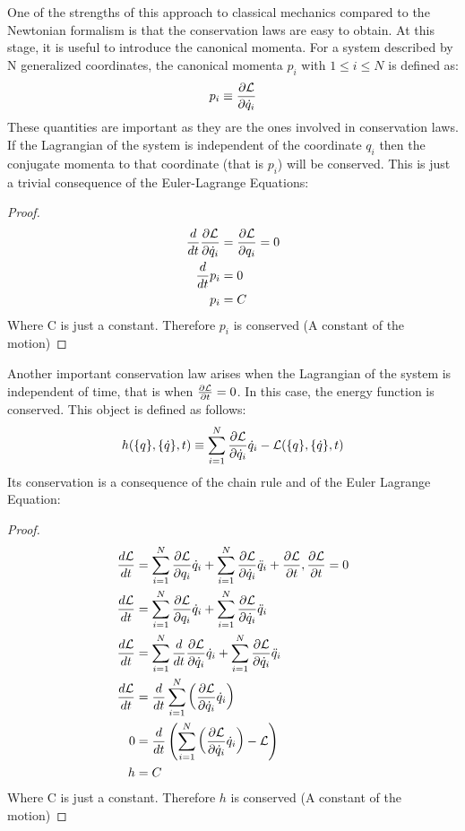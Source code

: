 \vspace{1mm}\noindent One of the strengths of this approach to classical mechanics compared to the Newtonian formalism is that the conservation laws are easy to obtain. At this stage, it is useful to introduce the canonical momenta. For a system described by N generalized coordinates, the canonical momenta $p_i$ with $1\leq i \leq N$ is defined as:
\begin{equation}
    p_i \equiv \frac{\partial \mathcal{L}}{\partial \dot q_i}
\end{equation}
These quantities are important as they are the ones involved in conservation laws. If the Lagrangian of the system is independent of the coordinate $q_i$ then the conjugate momenta to that coordinate (that is $p_i$) will be conserved. This is just a trivial consequence of the Euler-Lagrange Equations:
\begin{proof}
    \begin{align}
      \frac{d}{dt} \frac{\partial  \mathcal{L}}{\partial \dot q_i} &=   \frac{\partial  \mathcal{L}}{\partial q_i} = 0 \\
      \frac{d}{dt} p_i &= 0 \\
      p_i &= C
\end{align}
Where C is just a constant. Therefore $p_i$ is conserved (A constant of the motion)
\end{proof}
Another important conservation law arises when the Lagrangian of the system is independent of time, that is when $\frac{\partial\mathcal{L}}{\partial t}=0$. In this case, the energy function is conserved. This object is defined as follows:
\begin{equation}
    h(\{q\},\{\dot q\},t) \equiv \sum_{i=1}^N \frac{\partial  \mathcal{L}}{\partial \dot q_i}\dot q_i - \mathcal{L}(\{q\},\{\dot q\},t)
\end{equation}
Its conservation is a consequence of the chain rule and of the Euler Lagrange Equation:
\begin{proof}
\begin{align}
    \frac{d\mathcal{L}}{dt} &= \sum_{i=1}^N\frac{\partial \mathcal{L}}{\partial q_i}\dot q_i +  \sum_{i=1}^N\frac{\partial \mathcal{L}}{\partial \dot q_i}\ddot q_i + \frac{\partial\mathcal{L}}{\partial t}, \frac{\partial\mathcal{L}}{\partial t}=0\\
     \frac{d\mathcal{L}}{dt} &= \sum_{i=1}^N\frac{\partial \mathcal{L}}{\partial q_i}\dot q_i +  \sum_{i=1}^N\frac{\partial \mathcal{L}}{\partial \dot q_i}\ddot q_i\\
      \frac{d\mathcal{L}}{dt} &= \sum_{i=1}^N\frac{d}{dt}\frac{\partial \mathcal{L}}{\partial \dot q_i}\dot q_i +  \sum_{i=1}^N\frac{\partial \mathcal{L}}{\partial \dot q_i}\ddot q_i \\
         \frac{d\mathcal{L}}{dt} &= \frac{d}{dt}\sum_{i=1}^N\left(\frac{\partial \mathcal{L}}{\partial \dot q_i}\dot q_i\right)\\
          0&=\frac{d}{dt}\left(\sum_{i=1}^N\left(\frac{\partial \mathcal{L}}{\partial \dot q_i}\dot q_i\right) - \mathcal{L}\right) \\
          h &=C
\end{align}
Where C is just a constant. Therefore $h$ is conserved (A constant of the motion)
\end{proof}
